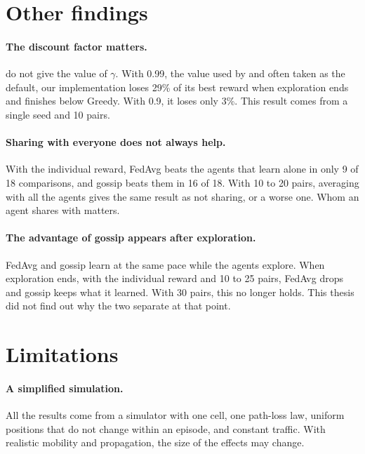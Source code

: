 \section{Other findings}
\label{sec:conc-findings}

\paragraph{The discount factor matters.} \citet{li+22fedmarl} do not give the value of $\gamma$. With 0.99, the
value used by \citet{mnih+15dqn} and often taken as the default, our implementation loses 29\% of its best reward when
exploration ends and finishes below Greedy. With 0.9, it loses only 3\%. This result comes from a single seed
and 10 pairs.

\paragraph{Sharing with everyone does not always help.} With the individual reward, \ac{FedAvg} beats the
agents that learn alone in only 9 of 18 comparisons, and gossip beats them in 16 of 18. With 10 to 20 pairs,
averaging with all the agents gives the same result as not sharing, or a worse one. Whom an agent shares with
matters.

\paragraph{The advantage of gossip appears after exploration.} \ac{FedAvg} and gossip learn at the same pace
while the agents explore. When exploration ends, with the individual reward and 10 to 25 pairs, \ac{FedAvg}
drops and gossip keeps what it learned. With 30 pairs, this no longer holds. This thesis did not find out why
the two separate at that point.

\section{Limitations}
\label{sec:conc-limitations}

\paragraph{A simplified simulation.} All the results come from a simulator with one cell, one path-loss law,
uniform positions that do not change within an episode, and constant traffic. With realistic mobility and
propagation, the size of the effects may change.

